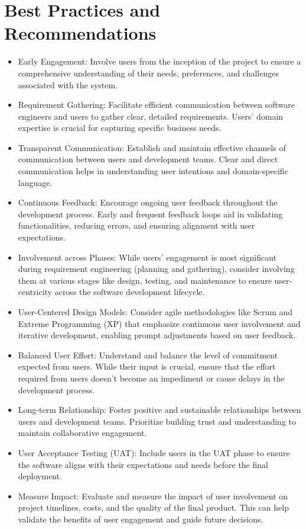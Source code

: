 \documentclass{article}
\begin{document}
\section{Best Practices and Recommendations}
\begin{itemize}
    \item Early Engagement: Involve users from the inception of the project to ensure a comprehensive understanding of their needs, preferences, and challenges associated with the system.

    \item Requirement Gathering: Facilitate efficient communication between software engineers and users to gather clear, detailed requirements. Users' domain expertise is crucial for capturing specific business needs.
    
    \item Transparent Communication: Establish and maintain effective channels of communication between users and development teams. Clear and direct communication helps in understanding user intentions and domain-specific language.
    
    \item Continuous Feedback: Encourage ongoing user feedback throughout the development process. Early and frequent feedback loops aid in validating functionalities, reducing errors, and ensuring alignment with user expectations.
    
    \item Involvement across Phases: While users' engagement is most significant during requirement engineering (planning and gathering), consider involving them at various stages like design, testing, and maintenance to ensure user-centricity across the software development lifecycle.
    
    \item User-Centered Design Models: Consider agile methodologies like Scrum and Extreme Programming (XP) that emphasize continuous user involvement and iterative development, enabling prompt adjustments based on user feedback.
    
    \item Balanced User Effort: Understand and balance the level of commitment expected from users. While their input is crucial, ensure that the effort required from users doesn't become an impediment or cause delays in the development process.
    
    \item Long-term Relationship: Foster positive and sustainable relationships between users and development teams. Prioritize building trust and understanding to maintain collaborative engagement.
    
    \item User Acceptance Testing (UAT): Include users in the UAT phase to ensure the software aligns with their expectations and needs before the final deployment.
    
    \item Measure Impact: Evaluate and measure the impact of user involvement on project timelines, costs, and the quality of the final product. This can help validate the benefits of user engagement and guide future decisions.
\end{itemize}
\end{document}
